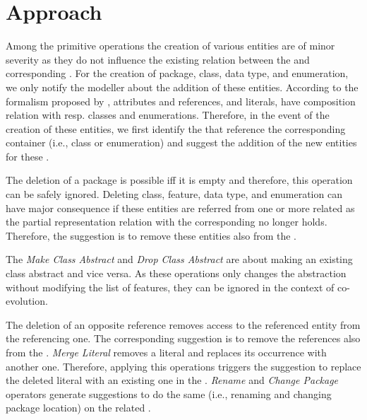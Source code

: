 \section{Approach} 
\label{sec:Approach}


Among the primitive operations the creation of various entities are of minor severity as they do not influence the existing relation between the \metamodel and corresponding \viewtypes. For the creation of package, class, data type, and enumeration, we only notify the modeller about the addition of these entities. 
According to the \metamodeling formalism proposed by \cite{herrmannsdoerfer_extensive_2011}, attributes and references, and literals, have composition relation with resp. classes and enumerations. Therefore, in the event of the creation of these entities, we first identify the \viewtypes that reference the corresponding container (i.e., class or enumeration) and suggest the addition of the new entities for these \viewtypes.

The deletion of a package is possible iff it is empty and therefore, this operation can be safely ignored. Deleting class, feature, data type, and enumeration can have major consequence if these entities are referred from one or more related \viewtypes as the partial representation relation with the corresponding \metamodel no longer holds. Therefore, the suggestion is to remove these entities also from the \viewtypes.

The \textit{Make Class Abstract} and \textit{Drop Class Abstract} are about making an existing class abstract and vice versa. As these operations only changes the abstraction without modifying the list of features, they can be ignored in the context of \viewtype co-evolution. 

The deletion of an opposite reference removes access to the referenced entity from the referencing one. The corresponding suggestion is to remove the references also from the \viewtype. \textit{Merge Literal} removes a literal and replaces its occurrence with another one. Therefore, applying this operations triggers the suggestion to replace the deleted literal with an existing one in the \viewtype. \textit{Rename} and \textit{Change Package} operators generate suggestions to do the same (i.e., renaming and changing package location) on the related \viewtypes.


